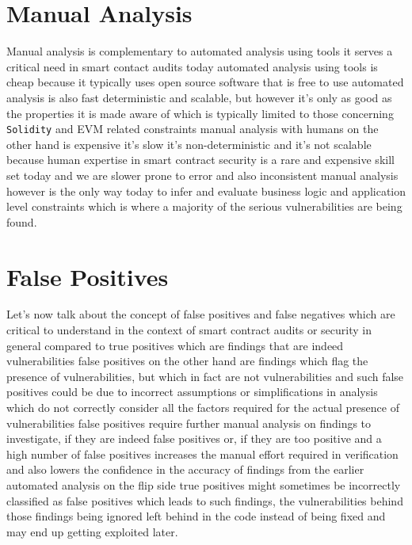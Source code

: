 \section{Manual Analysis}

Manual analysis is complementary to automated analysis using tools it serves a critical need in smart contact audits today automated analysis using tools is cheap because it typically uses open source software that is free to use automated analysis is also fast deterministic and scalable, but however it's only as good as the properties it is made aware of which is typically limited to those concerning \verb|Solidity| and EVM related constraints manual analysis with humans on the other hand is expensive it's slow it's non-deterministic and it's not scalable because human expertise in smart contract security is a rare and expensive skill set today and we are slower prone to error and also inconsistent manual analysis however is the only way today to infer and evaluate business logic and application level constraints which is where a majority of the serious vulnerabilities are being found.

\section{False Positives}

Let's now talk about the concept of false positives and false negatives which are critical to understand in the context of smart contract audits or security in general compared to true positives which are findings that are indeed vulnerabilities false positives on the other hand are findings which flag the presence of vulnerabilities, but which in fact are not vulnerabilities and such false positives could be due to incorrect assumptions or simplifications in analysis which do not correctly consider all the factors required for the actual presence of vulnerabilities false positives require further manual analysis on findings to investigate, if they are indeed false positives or, if they are too positive and a high number of false positives increases the manual effort required in verification and also lowers the confidence in the accuracy of findings from the earlier automated analysis on the flip side true positives might sometimes be incorrectly classified as false positives which leads to such findings, the vulnerabilities behind those findings being ignored left behind in the code instead of being fixed and may end up getting exploited later.


